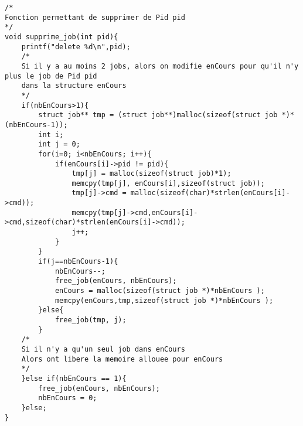 \documentclass{report}
\begin{document}
			\begin{lstlisting}
/*
Fonction permettant de supprimer de Pid pid
*/
void supprime_job(int pid){
	printf("delete %d\n",pid);
	/*
	Si il y a au moins 2 jobs, alors on modifie enCours pour qu'il n'y plus le job de Pid pid
	dans la structure enCours 
	*/
	if(nbEnCours>1){
		struct job** tmp = (struct job**)malloc(sizeof(struct job *)*(nbEnCours-1));
		int i;
		int j = 0;
		for(i=0; i<nbEnCours; i++){
			if(enCours[i]->pid != pid){
				tmp[j] = malloc(sizeof(struct job)*1);
				memcpy(tmp[j], enCours[i],sizeof(struct job));
				tmp[j]->cmd = malloc(sizeof(char)*strlen(enCours[i]->cmd));
				memcpy(tmp[j]->cmd,enCours[i]->cmd,sizeof(char)*strlen(enCours[i]->cmd));
				j++;
			}
		}
		if(j==nbEnCours-1){
			nbEnCours--;
			free_job(enCours, nbEnCours);
			enCours = malloc(sizeof(struct job *)*nbEnCours );
			memcpy(enCours,tmp,sizeof(struct job *)*nbEnCours );
		}else{
			free_job(tmp, j);
		}
	/*
	Si il n'y a qu'un seul job dans enCours
	Alors ont libere la memoire allouee pour enCours
	*/
	}else if(nbEnCours == 1){
		free_job(enCours, nbEnCours);
		nbEnCours = 0;
	}else;
}


\end{lstlisting}
\end{document}
